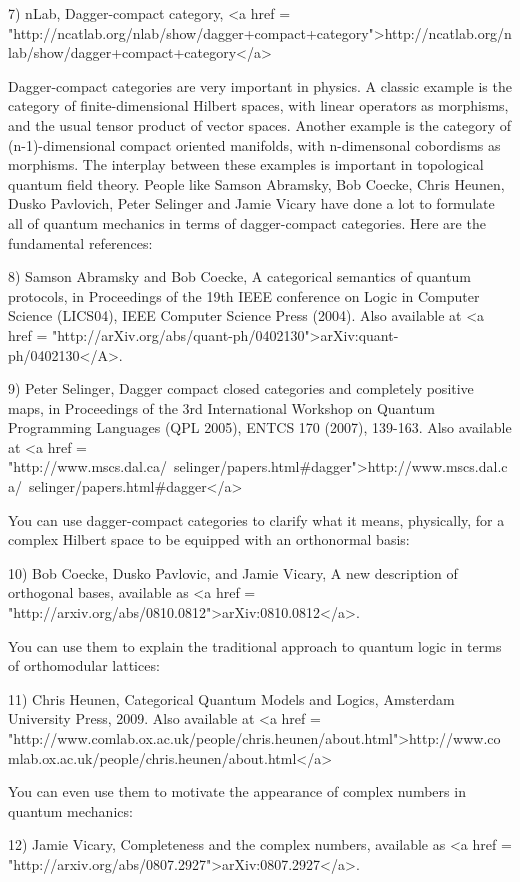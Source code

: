 7) nLab, Dagger-compact category, 
<a href = "http://ncatlab.org/nlab/show/dagger+compact+category">http://ncatlab.org/nlab/show/dagger+compact+category</a>

Dagger-compact categories are very important in physics.  A classic
example is the category of finite-dimensional Hilbert spaces, with
linear operators as morphisms, and the usual tensor product of vector
spaces.  Another example is the category of (n-1)-dimensional compact
oriented manifolds, with n-dimensonal cobordisms as morphisms.  The
interplay between these examples is important in topological quantum
field theory.  People like Samson Abramsky, Bob Coecke, Chris Heunen,
Dusko Pavlovich, Peter Selinger and Jamie Vicary have done a lot to
formulate all of quantum mechanics in terms of dagger-compact
categories.  Here are the fundamental references:

8) Samson Abramsky and Bob Coecke, A categorical semantics of quantum
protocols, in Proceedings of the 19th IEEE conference on Logic in
Computer Science (LICS04), IEEE Computer Science Press (2004).
Also available at <a href = "http://arXiv.org/abs/quant-ph/0402130">arXiv:quant-ph/0402130</A>.

9) Peter Selinger, Dagger compact closed categories and completely
positive maps, in Proceedings of the 3rd International Workshop on
Quantum Programming Languages (QPL 2005), ENTCS 170 (2007), 139-163.
Also available at <a href = "http://www.mscs.dal.ca/~selinger/papers.html#dagger">http://www.mscs.dal.ca/~selinger/papers.html#dagger</a>

You can use dagger-compact categories to clarify what it means,
physically, for a complex Hilbert space to be equipped with an
orthonormal basis:

10) Bob Coecke, Dusko Pavlovic, and Jamie Vicary, A new description of
orthogonal bases, available as
<a href = "http://arxiv.org/abs/0810.0812">arXiv:0810.0812</a>.

You can use them to explain the traditional approach to quantum logic
in terms of orthomodular lattices:

11) Chris Heunen, Categorical Quantum Models and Logics, Amsterdam
University Press, 2009.  Also available at  
<a href = "http://www.comlab.ox.ac.uk/people/chris.heunen/about.html">http://www.comlab.ox.ac.uk/people/chris.heunen/about.html</a>

You can even use them to motivate the appearance of complex
numbers in quantum mechanics:

12) Jamie Vicary, Completeness and the complex numbers, available as
<a href = "http://arxiv.org/abs/0807.2927">arXiv:0807.2927</a>.

